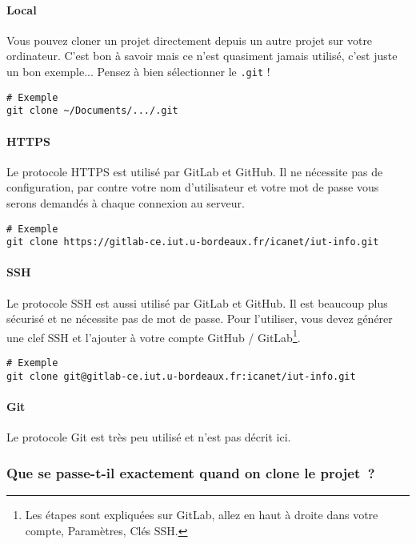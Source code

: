 \documentclass[10pt,a4paper]{article}
\begin{document}
\paragraph{Local} Vous pouvez cloner un projet directement depuis un autre projet sur votre ordinateur. C'est bon à savoir mais ce n'est quasiment jamais utilisé, c'est juste un bon exemple... Pensez à bien sélectionner le {\tt .git} !

\begin{verbatim}
# Exemple
git clone ~/Documents/.../.git
\end{verbatim}

\paragraph{HTTPS}

Le protocole HTTPS est utilisé par GitLab et GitHub. Il ne nécessite pas de configuration, par contre votre nom d'utilisateur et votre mot de passe vous serons demandés à chaque connexion au serveur.

\begin{verbatim}
# Exemple
git clone https://gitlab-ce.iut.u-bordeaux.fr/icanet/iut-info.git
\end{verbatim}

\paragraph{SSH}

Le protocole SSH est aussi utilisé par GitLab et GitHub. Il est beaucoup plus sécurisé et ne nécessite pas de mot de passe. Pour l'utiliser, vous devez générer une clef SSH et l'ajouter à votre compte GitHub / GitLab\footnote{Les étapes sont expliquées sur GitLab, allez en haut à droite dans votre compte, Paramètres, Clés SSH.}.

\begin{verbatim}
# Exemple
git clone git@gitlab-ce.iut.u-bordeaux.fr:icanet/iut-info.git
\end{verbatim}

\paragraph{Git}

Le protocole Git est très peu utilisé et n'est pas décrit ici.

\subsubsection{Que se passe-t-il exactement quand on clone le projet~?}
\end{document}
